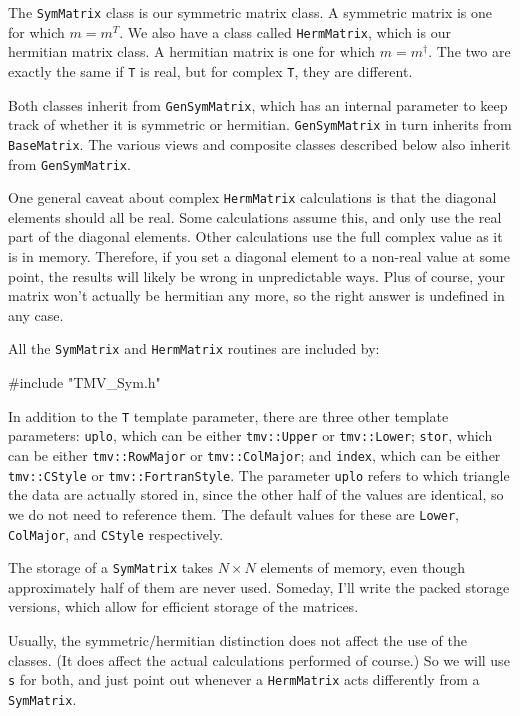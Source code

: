 \documentclass[twoside,letterpaper,11pt]{article}
\renewcommand{\tt}[1]{{\lstinline {#1}}}
\begin{document}
The \tt{SymMatrix} class is our symmetric matrix class.  A symmetric matrix is
one for which $m = m^T$.  We also have a class called
\tt{HermMatrix}, which is our hermitian matrix class.  A hermitian matrix
is one for which $m = m^\dagger$.  The two are exactly the same 
if \tt{T} is real, but for complex \tt{T}, they are different.

Both classes inherit from \tt{GenSymMatrix},
which has an internal parameter to keep track
of whether it is symmetric or hermitian.
\tt{GenSymMatrix} in turn inherits from \tt{BaseMatrix}.  
The various views and composite classes described below 
also inherit from \tt{GenSymMatrix}.

One general caveat about complex \tt{HermMatrix} calculations is that the diagonal
elements should all be real.  Some calculations assume this, and only 
use the real part of the diagonal elements.  Other calculations use the 
full complex value as it is in memory.  Therefore, if you set a diagonal element 
to a non-real value at some point, the results will likely be wrong in
unpredictable ways.  Plus of course, your matrix won't actually be hermitian any more,
so the right answer is undefined in any case.

All the \tt{SymMatrix} and \tt{HermMatrix} routines are included by:
\begin{tmvcode}
#include "TMV_Sym.h"
\end{tmvcode}

In addition to the \tt{T} template parameter, there are three other template 
parameters: \tt{uplo}, which can be either \tt{tmv::Upper} or \tt{tmv::Lower};
\tt{stor}, which can be either \tt{tmv::RowMajor} or \tt{tmv::ColMajor}; and
\tt{index}, which can be either \tt{tmv::CStyle} or \tt{tmv::FortranStyle}.
The parameter \tt{uplo} refers to which triangle the data are actually stored in, 
since the
other half of the values are identical, so we do not need to reference them.
The default values for these are \tt{Lower}, \tt{ColMajor}, and \tt{CStyle}
respectively.

The storage of a \tt{SymMatrix} takes
$N \times N$ elements of memory, even though approximately half of them 
are never used.  Someday, I'll write the packed storage versions, which allow for
efficient storage of the matrices.

Usually, the symmetric/hermitian distinction does not affect the use of the classes.
(It does affect the actual calculations performed of course.)  So we will use 
\tt{s} for both, and just point out whenever a \tt{HermMatrix} acts differently
from a \tt{SymMatrix}.
\end{document}
